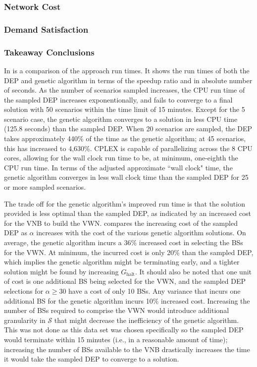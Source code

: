 \documentclass[12pt,dvipsnames]{report}
\begin{document}
\subsubsection{Network Cost}

\subsubsection{Demand Satisfaction}

\subsubsection{Takeaway Conclusions}

\iffalse
In  is a comparison of the approach run times.  It shows the run times of both the DEP and genetic algorithm in terms of the speedup ratio and in absolute number of seconds.  As the number of scenarios sampled increases, the CPU run time of the sampled DEP increases exponentionally, and fails to converge to a final solution with 50 scenarios within the time limit of 15 minutes.  Except for the 5 scenario case, the genetic algorithm converges to a solution in less CPU time (125.8 seconds) than the sampled DEP.  When 20 scenarios are sampled, the DEP takes approximately 440\% of the time as the genetic algorithm; at 45 scenarios, this has increased to 4,630\%.  CPLEX is capable of parallelizing across the 8 CPU cores, allowing for the wall clock run time to be, at minimum, one-eighth the CPU run time.  In terms of the adjusted approximate ``wall clock" time, the genetic algorithm converges in less wall clock time than the sampled DEP for 25 or more sampled scenarios.

The trade off for the genetic algorithm's improved run time is that the solution provided is less optimal than the sampled DEP, as indicated by an increased cost for the VNB to build the VWN.   compares the increasing cost of the sampled DEP as $\alpha$ increases with the cost of the various genetic algorithm solutions.  On average, the genetic algorithm incurs a 36\% increased cost in selecting the BSs for the VWN.  At minimum, the incurred cost is only 20\% than the sampled DEP, which implies the genetic algorithm might be terminating early, and a tighter solution might be found by increasing $G_\text{halt}$.  It should also be noted that one unit of cost is one additional BS being selected for the VWN, and the sampled DEP selections for $\alpha \geq 30$ have a cost of only 10 BSs.  Any variance that incurs one additional BS for the genetic algorithm incurs 10\% increased cost.  Increasing the number of BSs required to comprise the VWN would introduce additional granularity in $\mathcal{S}$ that might decrease the inefficiency of the genetic algorithm.  This was not done as this data set was chosen specifically so the sampled DEP would terminate within 15 minutes (i.e., in a reasonable amount of time); increasing the number of BSs available to the VNB drastically increases the time it would take the sampled DEP to converge to a solution.
\end{document}
